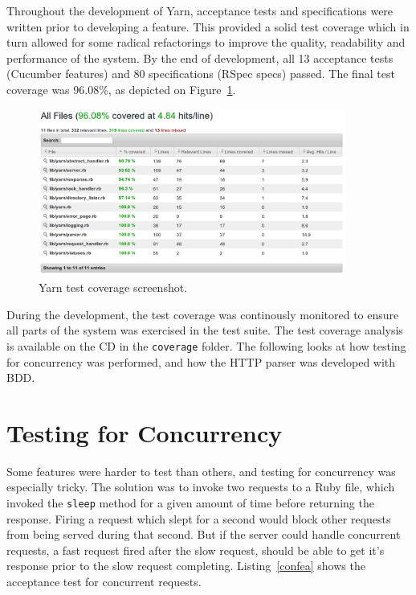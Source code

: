 Throughout the development of Yarn, acceptance tests and specifications were
written prior to developing a feature. This provided a solid test coverage
which in turn allowed for some radical refactorings to improve the quality,
readability and performance of the system. By the end of development,
all 13 acceptance tests (Cucumber features) and 80 specifications (RSpec
specs) passed.  The final test coverage was 96.08\%, as depicted on
Figure~\ref{coverage}. 

\begin{figure}[htb]
  \centering
  \includegraphics[width=0.9\textwidth]{img/coverage.png}
  \caption{Yarn test coverage screenshot.}
  \label{coverage}
\end{figure}

During the development, the test coverage was continously monitored to ensure
all parts of the system was exercised in the test suite. The test coverage
analysis is available on the CD in the \texttt{coverage} folder. The following
looks at how testing for concurrency was performed, and how the HTTP parser
was developed with BDD.

\section{Testing for Concurrency}
Some features were harder to test than others, and testing for concurrency was
especially tricky. The solution was to invoke two requests to a Ruby file, 
which invoked the \texttt{sleep} method for a given amount of time before
returning the response. Firing a request which slept for a second would block
other requests from being served during that second. But if the server could
handle concurrent requests, a fast request fired after the slow request,
should be able to get it's response prior to the slow request completing.
Listing~\ref{confea} shows the acceptance test for concurrent requests.

